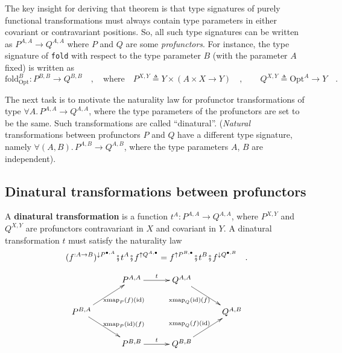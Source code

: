 The key insight for deriving that theorem is that type signatures
of purely functional transformations must always contain type parameters
in either covariant or contravariant positions. So, all such type
signatures can be written as $P^{A,A}\rightarrow Q^{A,A}$ where $P$
and $Q$ are some \emph{profunctors}. For instance, the type signature
of \lstinline!fold! with respect to the type parameter $B$ (with
the parameter $A$ fixed) is written as
\begin{equation}
\text{fold}_{\text{Opt}}^{B}:P^{B,B}\rightarrow Q^{B,B}\quad,\quad\text{where}\quad P^{X,Y}\triangleq Y\times\left(A\times X\rightarrow Y\right)\quad,\quad\quad Q^{X,Y}\triangleq\text{Opt}^{A}\rightarrow Y\quad.\label{eq:fold-type-signature-via-profunctors-derivation1}
\end{equation}

The next task is to motivate the naturality law for profunctor transformations
of type $\forall A.\,P^{A,A}\rightarrow Q^{A,A}$, where the type
parameters of the profunctors are set to be the same. Such transformations
are called \textsf{``}dinatural\textsf{''}. (\emph{Natural} transformations between
profunctors $P$ and $Q$ have a different type signature, namely
$\forall(A,B).\,P^{A,B}\rightarrow Q^{A,B}$, where the type parameters
$A$, $B$ are independent).

\subsection{Dinatural transformations between profunctors}

A \textbf{dinatural transformation}
is a function $t^{A}:P^{A,A}\rightarrow Q^{A,A}$, where $P^{X,Y}$
and $Q^{X,Y}$ are profunctors contravariant in $X$ and covariant
in $Y$. A dinatural transformation $t$ must satisfy the naturality
law
\begin{equation}
(f^{:A\rightarrow B})^{\downarrow P^{\bullet,A}}\bef t^{A}\bef f^{\uparrow Q^{A,\bullet}}=f^{\uparrow P^{B,\bullet}}\bef t^{B}\bef f^{\downarrow Q^{\bullet,B}}\quad.\label{eq:naturality-law-for-dinatural-transformations-of-profunctors}
\end{equation}

\begin{wrapfigure}{l}{0.43\columnwidth}%
\vspace{-2\baselineskip}
\[
\xymatrix{\xyScaleY{1.8pc}\xyScaleX{2.5pc} & P^{A,A}\ar[r]\sp(0.5){t} & Q^{A,A}\ar[rd]\sb(0.45){\text{xmap}_{Q}(\text{id})(f)}\\
P^{B,A}\ar[rd]\sp(0.55){\text{xmap}_{P}(\text{id})(f)}\ar[ru]\sb(0.55){\text{xmap}_{P}(f)(\text{id})} &  &  & Q^{A,B}\\
 & P^{B,B}\ar[r]\sp(0.5){t} & Q^{B,B}\ar[ru]\sp(0.45){\text{xmap}_{Q}(f)(\text{id})}
}
\]

\vspace{-0.7\baselineskip}
\end{wrapfigure}%

